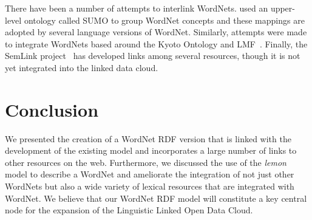 \documentclass[10pt, a4paper]{article}
\newcommand{\lemon}[0]{\emph{lemon}}
\begin{document}
There have been a number of attempts to interlink WordNets. 
\cite{pease2009formal} used an upper-level ontology called SUMO to group WordNet
concepts and these mappings are adopted by several language versions of WordNet.
Similarly, attempts were made to integrate WordNets based around the Kyoto
Ontology and LMF~\cite{soria2009wordnet}. Finally, the SemLink
project~\cite{palmer2009semlink} has
developed links among several resources, though it is not yet integrated into
the linked data cloud.

\section{Conclusion}

We presented the creation of a WordNet RDF version that is
linked with the development of the existing model and incorporates a
large number of links to other resources on the web. Furthermore, we discussed 
the use of the \lemon{} model to describe a WordNet and ameliorate the
integration of not just other WordNets but also a wide variety of lexical
resources that are integrated with WordNet. We believe that our WordNet RDF model 
will constitute a key central node for the expansion of the Linguistic
Linked Open Data Cloud.



\end{document}
